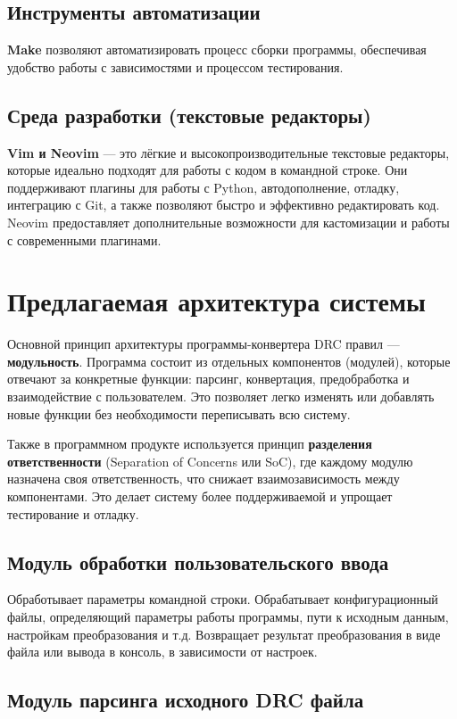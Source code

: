 \subsection{Инструменты автоматизации}
\textbf{Make} позволяют автоматизировать процесс сборки программы,
обеспечивая удобство работы с зависимостями и процессом тестирования.

\subsection{Среда разработки (текстовые редакторы)}
\textbf{Vim и Neovim} --- это лёгкие
и высокопроизводительные текстовые редакторы,
которые идеально подходят для работы с кодом в командной строке.
Они поддерживают плагины для работы с Python, автодополнение, отладку,
интеграцию с Git, а также позволяют быстро
и эффективно редактировать код.
Neovim предоставляет дополнительные возможности
для кастомизации и работы с современными плагинами.

\section{Предлагаемая архитектура системы}

Основной принцип архитектуры программы-конвертера DRC правил
--- \textbf{модульность}.
Программа состоит из отдельных компонентов (модулей),
которые отвечают за конкретные функции:
парсинг, конвертация, предобработка и взаимодействие с пользователем.
Это позволяет легко изменять или добавлять новые функции
без необходимости переписывать всю систему.\par
Также в программном продукте используется принцип
\textbf{разделения ответственности} 
(Separation of Concerns или SoC), где каждому модулю назначена
своя ответственность, что снижает взаимозависимость между компонентами.
Это делает систему более поддерживаемой и упрощает тестирование и отладку.

\subsection{Модуль обработки пользовательского ввода}

Обработывает параметры командной строки.
Обрабатывает конфигурационный файлы,
определяющий параметры работы программы,
пути к исходным данным, настройкам преобразования и т.д.
Возвращает результат преобразования в виде файла или вывода в консоль,
в зависимости от настроек.

\subsection{Модуль парсинга исходного DRC файла}

